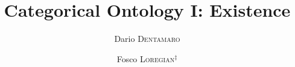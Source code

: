 \documentclass[a4paper,9pt]{../birkjour}
\title{Categorical Ontology I: Existence}
\author{Dario \textsc{Dentamaro}}
\author{Fosco \textsc{Loregian}$^\ddag$}
\begin{document}
\scriptsize

\maketitle

 
\end{document}
